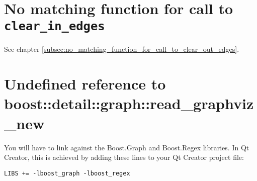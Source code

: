 \section{No matching function for call to \verb;clear_in_edges;}
\label{subsec:no_matching_function_for_call_to_clear_in_edges}

See chapter \ref{subsec:no_matching_function_for_call_to_clear_out_edges}.

\section{Undefined reference to boost::detail::graph::read_graphviz_new}
\label{subsec:undefined_reference_to_read_graphviz_new}

You will have to link 
against the Boost.Graph and Boost.Regex libraries.
In Qt Creator, this is achieved by adding these lines to your Qt Creator
project file:

\begin{verbatim}
LIBS += -lboost_graph -lboost_regex 
\end{verbatim}

